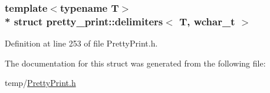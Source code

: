 \subsubsection*{template$<$typename T$>$\\*
struct pretty\+\_\+print\+::delimiters$<$ T, wchar\+\_\+t $>$}



Definition at line 253 of file Pretty\+Print.\+h.



The documentation for this struct was generated from the following file\+:\begin{DoxyCompactItemize}
\item 
temp/\hyperlink{PrettyPrint_8h}{Pretty\+Print.\+h}\end{DoxyCompactItemize}
